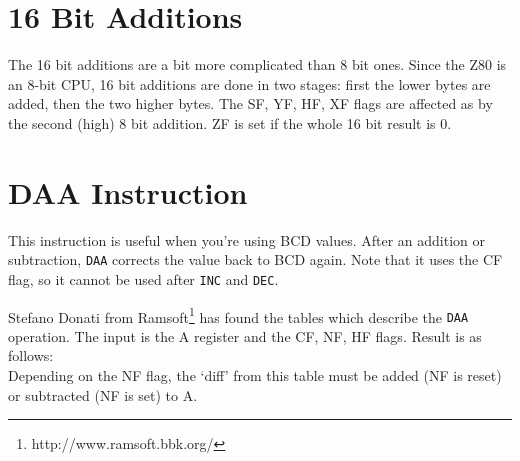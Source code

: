 \documentclass[oneside,a4paper]{book}
\begin{document}
\section{16 Bit Additions}

The 16 bit additions are a bit more complicated than 8 bit ones. Since the 
Z80 is an 8-bit CPU, 16 bit additions are done in two stages: first the 
lower bytes are added, then the two higher bytes. The SF, YF, HF, XF flags 
are affected as by the second (high) 8 bit addition. ZF is set if the whole 
16 bit result is 0.


\section{DAA Instruction}
\label{daa}

This instruction is useful when you're using BCD values. After an addition
or subtraction, {\tt DAA} corrects the value back to BCD again.  Note that 
it uses the CF flag, so it cannot be used after {\tt INC} and {\tt DEC}.

Stefano Donati from Ramsoft\footnote{http://www.ramsoft.bbk.org/} has
found the tables which describe the {\tt DAA} operation. The input is
the A register and the CF, NF, HF flags. Result is as follows: \\[2ex]


Depending on the NF flag, the `diff' from this table must be added (NF is
reset) or subtracted (NF is set) to A.\\[2ex]

 
\end{document}
